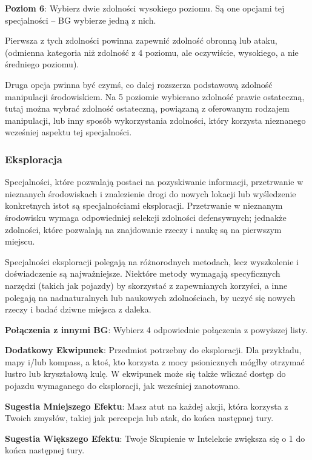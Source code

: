 \textbf{Poziom 6}: Wybierz dwie zdolności wysokiego poziomu. Są one opcjami tej specjalności – BG wybierze jedną z nich.

Pierwsza z tych zdolności powinna zapewnić zdolność obronną lub ataku, (odmienna kategoria niż zdolność z 4 poziomu, ale oczywiście, wysokiego, a nie średniego poziomu).

Druga opcja pwinna być czymś, co dalej rozszerza podstawową zdolność manipulacji środowiskiem. Na 5 poziomie wybierano zdolność prawie ostateczną, tutaj można wybrać zdolność ostateczną, powiązaną z oferowanym rodzajem manipulacji, lub inny sposób wykorzystania zdolności, który korzysta nieznanego wcześniej aspektu tej specjalności.

\subsubsection{Eksploracja}

Specjalności, które pozwalają postaci na pozyskiwanie informacji, przetrwanie w nieznanych środowiskach i znalezienie drogi do nowych lokacji lub wyśledzenie konkretnych istot są specjalnościami eksploracji. Przetrwanie w nieznanym środowisku wymaga odpowiedniej selekcji zdolności defensywnych; jednakże zdolności, które pozwalają na znajdowanie rzeczy i naukę są na pierwszym miejscu.

Specjalności eksploracji polegają na różnorodnych metodach, lecz wyszkolenie i doświadczenie są najważniejsze. Niektóre metody wymagają specyficznych narzędzi (takich jak pojazdy) by skorzystać z zapewnianych korzyści, a inne polegają na nadnaturalnych lub naukowych zdolnościach, by uczyć się nowych rzeczy i badać dziwne miejsca z daleka.

\textbf{Połączenia z innymi BG}: Wybierz 4 odpowiednie połączenia z powyższej listy.

\textbf{Dodatkowy Ekwipunek}: Przedmiot potrzebny do eksploracji. Dla przykładu, mapy i/lub kompass, a ktoś, kto korzysta z mocy psionicznych mógłby otrzymać lustro lub kryształową kulę. W ekwipunek może się także wliczać dostęp do pojazdu wymaganego do eksploracji, jak wcześniej zanotowano. 

\textbf{Sugestia Mniejszego Efektu}: Masz atut na każdej akcji, która korzysta z Twoich zmysłów, takiej jak percepcja lub atak, do końca następnej tury.

\textbf{Sugestia Większego Efektu}: Twoje Skupienie w Intelekcie zwiększa się o 1 do końca następnej tury.

